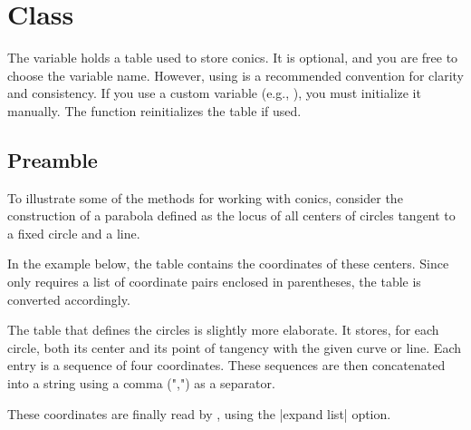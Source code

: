 \newpage

\section{Class } %
\label{sec:class_iclass_conic}

The variable  holds a table used to store conics. It is optional, and you are free to choose the variable name. However, using  is a recommended convention for clarity and consistency. If you use a custom variable (e.g., ), you must initialize it manually. The  function reinitializes the  table if used.

\subsection{Preamble} %
\label{sub:preamble}

To illustrate some of the methods for working with conics, consider the construction of a parabola defined as the locus of all centers of circles tangent to a fixed circle and a line.

In the example below, the table  contains the coordinates of these centers. Since \TIKZ{} only requires a list of coordinate pairs enclosed in parentheses, the table is converted accordingly.

The table that defines the circles is slightly more elaborate. It stores, for each circle, both its center and its point of tangency with the given curve or line. Each entry is a sequence of four coordinates. These sequences are then concatenated into a string using a comma (",") as a separator.

These coordinates are finally read by , using the |expand list| option.

\vspace{1em}
\begin{center}
\end{center}


